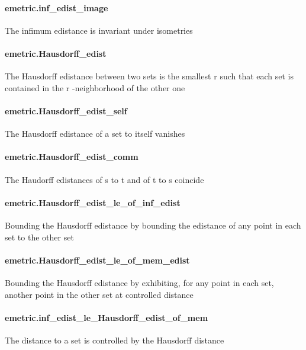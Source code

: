 \documentclass{article}
\begin{document}
\paragraph{emetric.inf\_edist\_image}
\par
The infimum edistance is invariant under isometries
\paragraph{emetric.Hausdorff\_edist}
\par
The Hausdorff edistance between two sets is the smallest 
\colorbox[RGB]{253,246,227}{{{{\color[RGB]{101, 123, 131} r }}}} such that each set
is contained in the 
\colorbox[RGB]{253,246,227}{{{{\color[RGB]{101, 123, 131} r }}}}-neighborhood of the other one
\paragraph{emetric.Hausdorff\_edist\_self}
\par
The Hausdorff edistance of a set to itself vanishes
\paragraph{emetric.Hausdorff\_edist\_comm}
\par
The Haudorff edistances of 
\colorbox[RGB]{253,246,227}{{{{\color[RGB]{101, 123, 131} s }}}} to 
\colorbox[RGB]{253,246,227}{{{{\color[RGB]{101, 123, 131} t }}}} and of 
\colorbox[RGB]{253,246,227}{{{{\color[RGB]{101, 123, 131} t }}}} to 
\colorbox[RGB]{253,246,227}{{{{\color[RGB]{101, 123, 131} s }}}} coincide
\paragraph{emetric.Hausdorff\_edist\_le\_of\_inf\_edist}
\par
Bounding the Hausdorff edistance by bounding the edistance of any point
in each set to the other set
\paragraph{emetric.Hausdorff\_edist\_le\_of\_mem\_edist}
\par
Bounding the Hausdorff edistance by exhibiting, for any point in each set,
another point in the other set at controlled distance
\paragraph{emetric.inf\_edist\_le\_Hausdorff\_edist\_of\_mem}
\par
The distance to a set is controlled by the Hausdorff distance
\end{document}
